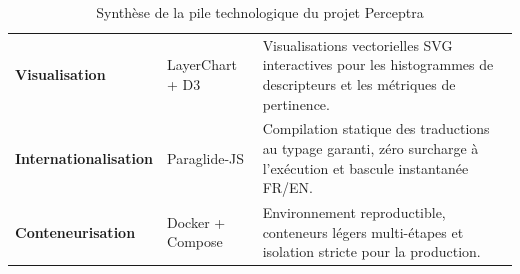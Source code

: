 \begin{table}[H]
\begin{tabularx}{\textwidth}{>{\bfseries}p{3.2cm}p{3.2cm}X}
Visualisation & LayerChart + D3 & Visualisations vectorielles SVG interactives pour les histogrammes de descripteurs et les métriques de pertinence. \\
Internationalisation & Paraglide-JS & Compilation statique des traductions au typage garanti, zéro surcharge à l'exécution et bascule instantanée FR/EN. \\
Conteneurisation & Docker + Compose & Environnement reproductible, conteneurs légers multi-étapes et isolation stricte pour la production. \\
\bottomrule
\end{tabularx}
\caption{Synthèse de la pile technologique du projet Perceptra}
\label{tab:stack_technologique}
\end{table}
